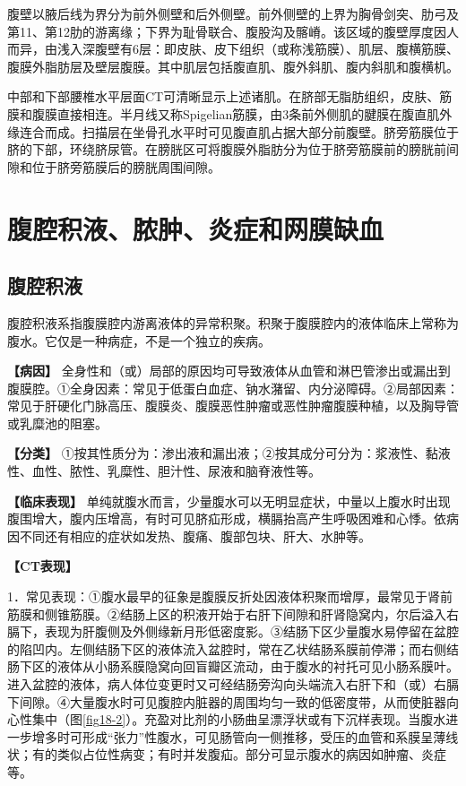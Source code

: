 腹壁以腋后线为界分为前外侧壁和后外侧壁。前外侧壁的上界为胸骨剑突、肋弓及第11、第12肋的游离缘；下界为耻骨联合、腹股沟及髂嵴。该区域的腹壁厚度因人而异，由浅入深腹壁有6层：即皮肤、皮下组织（或称浅筋膜）、肌层、腹横筋膜、腹膜外脂肪层及壁层腹膜。其中肌层包括腹直肌、腹外斜肌、腹内斜肌和腹横机。

中部和下部腰椎水平层面CT可清晰显示上述诸肌。在脐部无脂肪组织，皮肤、筋膜和腹膜直接相连。半月线又称Spigelian筋膜，由3条前外侧肌的腱膜在腹直肌外缘连合而成。扫描层在坐骨孔水平时可见腹直肌占据大部分前腹壁。脐旁筋膜位于脐的下部，环绕脐尿管。在膀胱区可将腹膜外脂肪分为位于脐旁筋膜前的膀胱前间隙和位于脐旁筋膜后的膀胱周围间隙。

\section{腹腔积液、脓肿、炎症和网膜缺血}

\subsection{腹腔积液}

腹腔积液系指腹膜腔内游离液体的异常积聚。积聚于腹膜腔内的液体临床上常称为腹水。它仅是一种病症，不是一个独立的疾病。

\textbf{【病因】}
全身性和（或）局部的原因均可导致液体从血管和淋巴管渗出或漏出到腹膜腔。①全身因素：常见于低蛋白血症、钠水潴留、内分泌障碍。②局部因素：常见于肝硬化门脉高压、腹膜炎、腹膜恶性肿瘤或恶性肿瘤腹膜种植，以及胸导管或乳糜池的阻塞。

\textbf{【分类】}
①按其性质分为：渗出液和漏出液；②按其成分可分为：浆液性、黏液性、血性、脓性、乳糜性、胆汁性、尿液和脑脊液性等。

\textbf{【临床表现】}
单纯就腹水而言，少量腹水可以无明显症状，中量以上腹水时出现腹围增大，腹内压增高，有时可见脐疝形成，横膈抬高产生呼吸困难和心悸。依病因不同还有相应的症状如发热、腹痛、腹部包块、肝大、水肿等。

\textbf{【CT表现】}

1．常见表现：①腹水最早的征象是腹膜反折处因液体积聚而增厚，最常见于肾前筋膜和侧锥筋膜。②结肠上区的积液开始于右肝下间隙和肝肾隐窝内，尔后溢入右膈下，表现为肝腹侧及外侧缘新月形低密度影。③结肠下区少量腹水易停留在盆腔的陷凹内。左侧结肠下区的液体流入盆腔时，常在乙状结肠系膜前停滞；而右侧结肠下区的液体从小肠系膜隐窝向回盲瓣区流动，由于腹水的衬托可见小肠系膜叶。进入盆腔的液体，病人体位变更时又可经结肠旁沟向头端流入右肝下和（或）右膈下间隙。④大量腹水时可见腹腔内脏器的周围均匀一致的低密度带，从而使脏器向心性集中（图\ref{fig18-2}）。充盈对比剂的小肠曲呈漂浮状或有下沉样表现。当腹水进一步增多时可形成“张力”性腹水，可见肠管向一侧推移，受压的血管和系膜呈薄线状；有的类似占位性病变；有时并发腹疝。部分可显示腹水的病因如肿瘤、炎症等。

